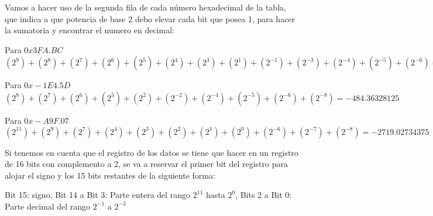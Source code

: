 \documentclass[stu, 12pt, letterpaper, donotrepeattitle, floatsintext, natbib]{apa7}
\begin{document}
Vamos a hacer uso de la segunda fila de cada número hexadecimal de la tabla, que indica a que potencia de base 2 debo elevar cada bit que posea 1, para hacer la sumatoria y encontrar el numero en decimal:

Para $0x3FA.BC$
$(2^9)+(2^8)+(2^7)+(2^6)+(2^5)+(2^4)+(2^3)+(2^1)+(2^{-1})+(2^{-3})+(2^{-4})+(2^{-5})+(2^{-6}) = 1018.734375$

Para $0x-1E4.5D$
$(2^8)+(2^7)+(2^6)+(2^5)+(2^2)+(2^{-2})+(2^{-4})+(2^{-5})+(2^{-6})+(2^{-8}) = -484.36328125$

Para $0x-A9F.07$
$(2^{11})+(2^9)+(2^7)+(2^4)+(2^3)+(2^2)+(2^1)+(2^0)+(2^{-6})+(2^{-7})+(2^{-8}) = -2719.02734375$

Si tenemos en cuenta que el registro de los datos se tiene que hacer en un registro de 16 bits con complemento a 2, se va a reservar el primer bit del registro para alojar el signo y los 15 bits restantes de la siguiente forma:

Bit 15: signo, Bit 14 a Bit 3: Parte entera del rango $2^{11}$ hasta $2^0$, Bits 2 a Bit 0: Parte decimal del rango $2^{-1}$ a $2^{-3}$
\end{document}

